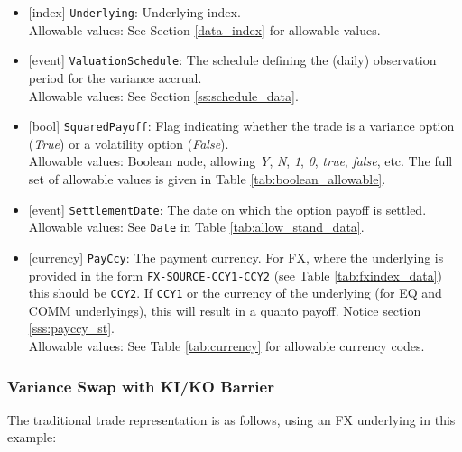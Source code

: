 \begin{itemize}
  \item{}[index] \lstinline!Underlying!: Underlying index. \\
  Allowable values: See Section \ref{data_index} for allowable values.
  \item{}[event] \lstinline!ValuationSchedule!: The schedule defining the (daily) observation period for the variance accrual. \\
  Allowable values: See Section \ref{ss:schedule_data}.
  \item{}[bool] \lstinline!SquaredPayoff!: Flag indicating whether the trade is a variance option (\emph{True}) or a volatility
  option (\emph{False}). \\
  Allowable values: Boolean node, allowing \emph{Y}, \emph{N}, \emph{1}, \emph{0}, \emph{true}, \emph{false}, etc.
  The full set of allowable values is given in Table \ref{tab:boolean_allowable}.
  \item{}[event] \lstinline!SettlementDate!: The date on which the option payoff is settled. \\
  Allowable values: See \lstinline!Date! in Table \ref{tab:allow_stand_data}.
  \item{}[currency] \lstinline!PayCcy!: The payment currency. For FX, where the underlying is provided
      in the form \lstinline!FX-SOURCE-CCY1-CCY2! (see Table \ref{tab:fxindex_data}) this should
      be \lstinline!CCY2!. If \lstinline!CCY1! or the currency of the underlying (for EQ and
      COMM underlyings), this will result in a quanto payoff. Notice section \ref{sss:payccy_st}. \\
        Allowable values: See Table \ref{tab:currency}  for allowable currency codes.
\end{itemize}

\subsubsection*{Variance Swap with KI/KO Barrier}

The traditional trade representation is as follows, using an FX underlying in this example:

